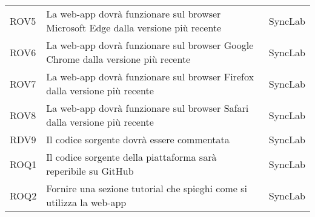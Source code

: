 \begin{center}
\begin{longtable}{ |p{1.5cm}|p{9cm}|p{1.5cm}|  }
        ROV5&La web-app dovrà funzionare sul browser Microsoft Edge dalla versione più recente&SyncLab\\
        ROV6&La web-app dovrà funzionare sul browser Google Chrome dalla versione più recente&SyncLab\\
        ROV7&La web-app dovrà funzionare sul browser Firefox dalla versione più recente&SyncLab\\
        ROV8&La web-app dovrà funzionare sul browser Safari dalla versione più recente&SyncLab\\
        RDV9&Il codice sorgente dovrà essere commentata&SyncLab\\
        ROQ1&Il codice sorgente della piattaforma sarà reperibile su GitHub&SyncLab\\
        ROQ2&Fornire una sezione tutorial che spieghi come si utilizza la web-app&SyncLab\\
\hline
\end{longtable}
\end{center}